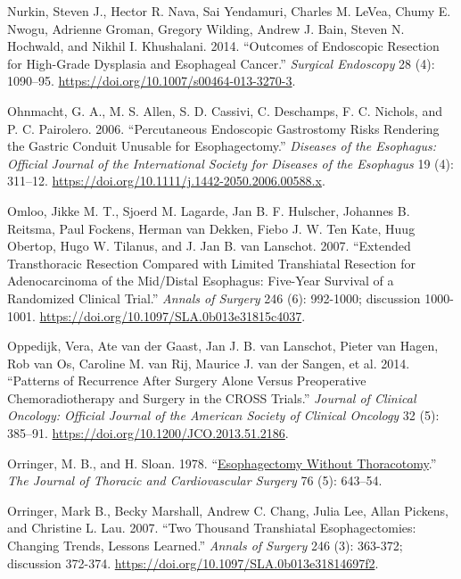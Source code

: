 \documentclass[
  letterpaper,
]{scrbook}
\newlength{\cslhangindent}
\newenvironment{CSLReferences}[2] %
 {\begin{list}{}{%
  \setlength{\itemindent}{0pt}
  \setlength{\leftmargin}{0pt}
  \setlength{\parsep}{0pt}
  \ifodd #1
   \setlength{\leftmargin}{\cslhangindent}
   \setlength{\itemindent}{-1\cslhangindent}
  \fi
  \setlength{\itemsep}{#2\baselineskip}}}
 {\end{list}}
\begin{document}
\begin{CSLReferences}{1}{0}
Nurkin, Steven J., Hector R. Nava, Sai Yendamuri, Charles M. LeVea,
Chumy E. Nwogu, Adrienne Groman, Gregory Wilding, Andrew J. Bain, Steven
N. Hochwald, and Nikhil I. Khushalani. 2014. {``Outcomes of Endoscopic
Resection for High-Grade Dysplasia and Esophageal Cancer.''}
\emph{Surgical Endoscopy} 28 (4): 1090--95.
\url{https://doi.org/10.1007/s00464-013-3270-3}.

Ohnmacht, G. A., M. S. Allen, S. D. Cassivi, C. Deschamps, F. C.
Nichols, and P. C. Pairolero. 2006. {``Percutaneous Endoscopic
Gastrostomy Risks Rendering the Gastric Conduit Unusable for
Esophagectomy.''} \emph{Diseases of the Esophagus: Official Journal of
the International Society for Diseases of the Esophagus} 19 (4):
311--12. \url{https://doi.org/10.1111/j.1442-2050.2006.00588.x}.

Omloo, Jikke M. T., Sjoerd M. Lagarde, Jan B. F. Hulscher, Johannes B.
Reitsma, Paul Fockens, Herman van Dekken, Fiebo J. W. Ten Kate, Huug
Obertop, Hugo W. Tilanus, and J. Jan B. van Lanschot. 2007. {``Extended
Transthoracic Resection Compared with Limited Transhiatal Resection for
Adenocarcinoma of the Mid/Distal Esophagus: Five-Year Survival of a
Randomized Clinical Trial.''} \emph{Annals of Surgery} 246 (6):
992-1000; discussion 1000-1001.
\url{https://doi.org/10.1097/SLA.0b013e31815c4037}.

Oppedijk, Vera, Ate van der Gaast, Jan J. B. van Lanschot, Pieter van
Hagen, Rob van Os, Caroline M. van Rij, Maurice J. van der Sangen, et
al. 2014. {``Patterns of Recurrence After Surgery Alone Versus
Preoperative Chemoradiotherapy and Surgery in the {CROSS} Trials.''}
\emph{Journal of Clinical Oncology: Official Journal of the American
Society of Clinical Oncology} 32 (5): 385--91.
\url{https://doi.org/10.1200/JCO.2013.51.2186}.

Orringer, M. B., and H. Sloan. 1978.
{``\href{https://www.ncbi.nlm.nih.gov/pubmed/703369}{Esophagectomy
Without Thoracotomy}.''} \emph{The Journal of Thoracic and
Cardiovascular Surgery} 76 (5): 643--54.

Orringer, Mark B., Becky Marshall, Andrew C. Chang, Julia Lee, Allan
Pickens, and Christine L. Lau. 2007. {``Two Thousand Transhiatal
Esophagectomies: Changing Trends, Lessons Learned.''} \emph{Annals of
Surgery} 246 (3): 363-372; discussion 372-374.
\url{https://doi.org/10.1097/SLA.0b013e31814697f2}.


\end{CSLReferences}
\end{document}

